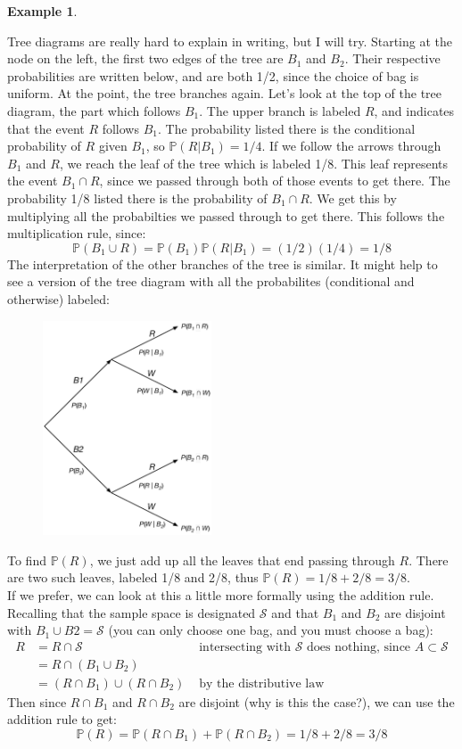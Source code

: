 \documentclass[12pt]{article}
\theoremstyle{definition}
\newtheorem*{example}{Example}
\theoremstyle{remark}
\def\P{{\mathbb P}}
\def\cals{{\mathcal S}}
\begin{document}
\begin{example}
\begin{enumerate}
Tree diagrams are really hard to explain in writing, but I will try. Starting at the node on the left, the first two edges of the tree are $B_1$ and $B_2$. Their respective probabilities are written below, and are both 1/2, since the choice of bag is uniform. At the point, the tree branches again. Let's look at the top of the tree diagram, the part which follows $B_1$. The upper branch is labeled $R$, and indicates that the event $R$ follows $B_1$. The probability listed there is the conditional probability of $R$ given $B_1$, so $\P(R|B_1) = 1/4$. If we follow the arrows through $B_1$ and $R$, we reach the leaf of the tree which is labeled 1/8. This leaf represents the event $B_1 \cap R$, since we passed through both of those events to get there. The probability 1/8 listed there is the probability of $B_1 \cap R$. We get this by multiplying all the probabilties we passed through to get there. This follows the multiplication rule, since:
\[
\P(B_1 \cup R) = \P(B_1)\P(R|B_1) = (1/2)(1/4) = 1/8
\]
The interpretation of the other branches of the tree is similar. It might help to see a version of the tree diagram with all the probabilites (conditional and otherwise) labeled: 
\begin{figure}[H]
\centering
\includegraphics[width=5cm]{tree2.eps}
\end{figure}

To find $\P(R)$, we just add up all the leaves that end passing through $R$. There are two such leaves, labeled 1/8 and 2/8, thus $\P(R) = 1/8 + 2/8 = 3/8$.\\

If we prefer, we can look at this a little more formally using the addition rule. Recalling that the sample space is designated $\cals$ and that $B_1$ and $B_2$ are disjoint with $B_1 \cup B2 = \cals$ (you can only choose one bag, and you must choose a bag):
\begin{align*}
R &= R \cap \cals & \text{ intersecting with $\cals$ does nothing, since $A \subset \cals$}\\
&= R \cap (B_1 \cup B_2) \\
&= (R \cap B_1) \cup (R \cap B_2) & \text{ by the distributive law}
\end{align*}
Then since $R \cap B_1$ and $R \cap B_2$ are disjoint (why is this the case?), we can use the addition rule to get:
\[
\P(R) = \P(R \cap B_1) + \P(R \cap B_2) = 1/8 + 2/8 = 3/8
\]
\end{enumerate}


\end{example}
\end{document}
